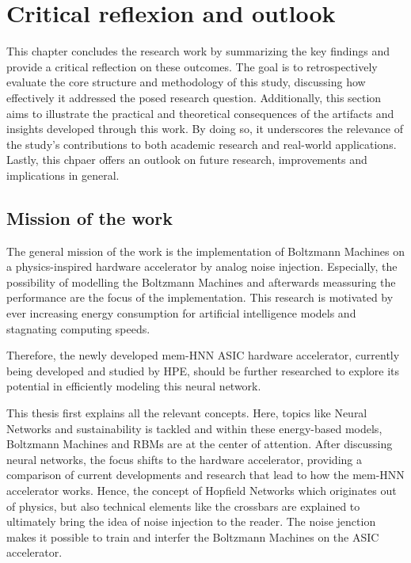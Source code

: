 \chapter{Critical reflexion and outlook}
This chapter concludes the research work by summarizing the key findings and provide a critical reflection on these outcomes.
The goal is to retrospectively evaluate the core structure and methodology of this study, discussing how effectively it addressed the posed research question.
Additionally, this section aims to illustrate the practical and theoretical consequences of the artifacts and insights developed through this work.
By doing so, it underscores the relevance of the study’s contributions to both academic research and real-world applications.
Lastly, this chpaer offers an outlook on future research, improvements and implications in general.

\section{Mission of the work}
The general mission of the work is the implementation of Boltzmann Machines on a physics-inspired 
hardware accelerator by analog noise injection. 
Especially, the possibility of modelling the Boltzmann Machines and afterwards meassuring the performance are the focus of the implementation.
This research is motivated by ever increasing energy consumption for artificial intelligence models and stagnating computing speeds.

Therefore, the newly developed \ac{mem-HNN} \ac{ASIC} hardware accelerator, currently being developed and studied by HPE,
should be further researched to explore its potential in efficiently modeling this neural network.

This thesis first explains all the relevant concepts.
Here, topics like Neural Networks and sustainability is tackled and within these energy-based models,
Boltzmann Machines and \ac{RBM}s are at the center of attention. 
After discussing neural networks, the focus shifts to the hardware accelerator, providing a comparison of current developments and research that lead to how the \ac{mem-HNN} accelerator works.
Hence, the concept of Hopfield Networks which originates out of physics, but also technical elements like the crossbars are explained to 
ultimately bring the idea of noise injection to the reader. 
The noise jenction makes it possible to train and interfer the Boltzmann Machines on the \ac{ASIC} accelerator.


